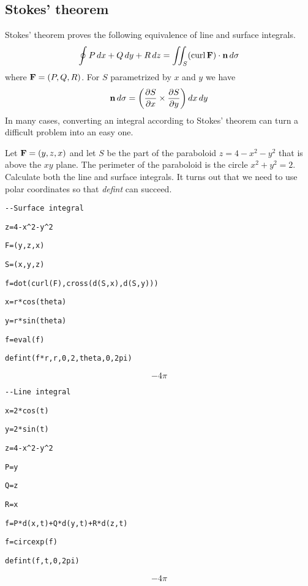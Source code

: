 \subsection{Stokes' theorem}
Stokes' theorem proves the following equivalence of line and surface
integrals.
%
$$\oint P\,dx+Q\,dy+R\,dz
=\int\!\!\!\int_S(\mathop{\rm curl}{\bf F})\cdot{\bf n}\,d\sigma
$$
where ${\bf F}=(P,Q,R)$.
For $S$ parametrized by $x$ and $y$ we have
$${\bf n}\,d\sigma=\left(
{\partial S\over\partial x}\times{\partial S\over\partial y}
\right)dx\,dy$$
In many cases, converting an integral according to
Stokes' theorem can turn a difficult problem into an easy one.

\medskip
\noindent
Let ${\bf F}=(y,z,x)$ and let $S$ be the part of the paraboloid
$z=4-x^2-y^2$
that is above the $xy$ plane.
The perimeter of the paraboloid is the circle $x^2+y^2=2$.
Calculate both the line and surface integrals.
It turns out that we need to use polar coordinates so that {\it defint} can
succeed.

\medskip
\verb$--Surface integral$

\verb$z=4-x^2-y^2$

\verb$F=(y,z,x)$

\verb$S=(x,y,z)$

\verb$f=dot(curl(F),cross(d(S,x),d(S,y)))$

\verb$x=r*cos(theta)$

\verb$y=r*sin(theta)$

\verb$f=eval(f)$

\verb$defint(f*r,r,0,2,theta,0,2pi)$

$$-4\pi$$

\verb$--Line integral$

\verb$x=2*cos(t)$

\verb$y=2*sin(t)$

\verb$z=4-x^2-y^2$

\verb$P=y$

\verb$Q=z$

\verb$R=x$

\verb$f=P*d(x,t)+Q*d(y,t)+R*d(z,t)$

\verb$f=circexp(f)$

\verb$defint(f,t,0,2pi)$

$$-4\pi$$

